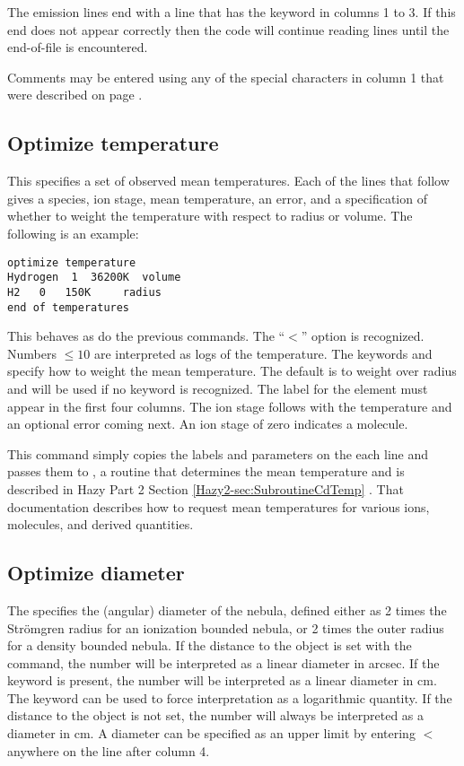 The emission lines end with a line that has the keyword
 in columns 1 to 3.
If this end does not appear correctly then the code will continue
reading lines until the end-of-file is encountered.

Comments may be entered using any of the special characters in column
1 that were described on page \pageref{sec:CommentsInInput}.

\subsection{Optimize temperature}

This specifies a set of observed mean temperatures.
Each of the lines
that follow gives a species, ion stage, mean temperature, an error,
and a specification of whether to weight the temperature with
respect to radius or volume.
The following is an example:
\begin{verbatim}
optimize temperature
Hydrogen  1  36200K  volume
H2   0   150K     radius
end of temperatures
\end{verbatim}

This behaves as do the previous commands.
The ``$<$'' option is
recognized.
Numbers $\le 10$ are interpreted as logs of the temperature.
The
keywords  and  specify how to
weight the mean temperature.
The default is to weight over radius and will be used if no keyword is
recognized.
The label for the element must appear in the first four columns.
The ion stage follows with the temperature and an optional error coming
next.
An ion stage of zero indicates a molecule.

This command simply copies the labels and parameters on the each line
and passes them to ,
a routine that determines the mean temperature
and is described in Hazy Part 2
Section \ref{Hazy2-sec:SubroutineCdTemp}
.
That documentation describes
how to request mean temperatures for various ions, molecules, and derived
quantities.

\subsection{Optimize diameter}

The specifies the (angular) diameter of the nebula, defined either as 2 times
the Str\"omgren radius for an ionization bounded nebula, or 2 times the outer
radius for a density bounded nebula. If the distance to the object is set with
the  command, the number will be interpreted as a linear
diameter in arcsec. If the keyword  is present, the number
will be interpreted as a linear diameter in cm. The keyword 
can be used to force interpretation as a logarithmic quantity. If the distance
to the object is not set, the number will always be interpreted as a diameter
in cm.
A diameter can be specified as an upper limit by entering
$<$ anywhere on the line after column 4.

